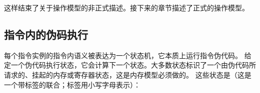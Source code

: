 这样结束了关于操作模型的非正式描述。接下来的章节描述了正式的操作模型。

\subsection{指令内的伪码执行}\label{sec:omm:pseudocode_exec}
每个指令实例的指令内语义被表达为一个状态机，它本质上运行指令伪代码。
给定一个伪代码执行状态，它会计算下一个状态。大多数状态标识了一个由伪代码所请求的、挂起的内存或寄存器状态，这是内存模型必须做的。
这些状态是（这是一个带标签的联合；标签用小写字母表示）：

